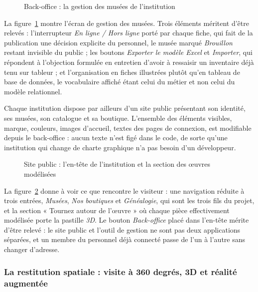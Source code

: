 \begin{figure}[!ht]
\centering
{}
\caption{Back-office : la gestion des musées de l'institution}
\label{fig:cap-erp}
\end{figure}

La figure~\ref{fig:cap-erp} montre l'écran de gestion des musées. Trois éléments
méritent d'être relevés : l'interrupteur \emph{En ligne / Hors ligne} porté par
chaque fiche, qui fait de la publication une décision explicite du personnel, le
musée marqué \emph{Brouillon} restant invisible du public ; les boutons
\emph{Exporter le modèle Excel} et \emph{Importer}, qui répondent à l'objection
formulée en entretien d'avoir à ressaisir un inventaire déjà tenu sur tableur ;
et l'organisation en fiches illustrées plutôt qu'en tableau de base de données,
le vocabulaire affiché étant celui du métier et non celui du modèle relationnel.

Chaque institution dispose par ailleurs d'un site public présentant son
identité, ses musées, son catalogue et sa boutique. L'ensemble des éléments
visibles, marque, couleurs, images d'accueil, textes des pages de connexion, est
modifiable depuis le back-office : aucun texte n'est figé dans le code, de sorte
qu'une institution qui change de charte graphique n'a pas besoin d'un
développeur.

\begin{figure}[!ht]
\centering
{}
\caption{Site public : l'en-tête de l'institution et la section des œuvres modélisées}
\label{fig:cap-public}
\end{figure}

La figure~\ref{fig:cap-public} donne à voir ce que rencontre le visiteur : une
navigation réduite à trois entrées, \emph{Musées}, \emph{Nos boutiques} et
\emph{Généalogie}, qui sont les trois fils du projet, et la section « Tournez
autour de l'œuvre » où chaque pièce effectivement modélisée porte la pastille
\emph{3D}. Le bouton \emph{Back-office} placé dans l'en-tête mérite d'être
relevé : le site public et l'outil de gestion ne sont pas deux applications
séparées, et un membre du personnel déjà connecté passe de l'un à l'autre sans
changer d'adresse.

\subsubsection{La restitution spatiale : visite à 360 degrés, 3D et réalité augmentée}

